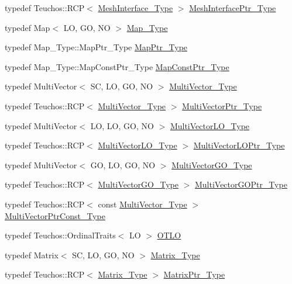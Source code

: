\begin{DoxyCompactItemize}
\item 
typedef Teuchos\+::\+R\+CP$<$ \hyperlink{classFEDD_1_1ErrorEstimation_a11fff10f0a859ff6a2bef01b0ac73943}{Mesh\+Interface\+\_\+\+Type} $>$ \hyperlink{classFEDD_1_1ErrorEstimation_aa6871369b5b28e20aac7c7178cdde50e}{Mesh\+Interface\+Ptr\+\_\+\+Type}
\item 
typedef Map$<$ LO, GO, NO $>$ \hyperlink{classFEDD_1_1ErrorEstimation_a94d0ce98d9e797cc35769bda8d3ef9fc}{Map\+\_\+\+Type}
\item 
typedef Map\+\_\+\+Type\+::\+Map\+Ptr\+\_\+\+Type \hyperlink{classFEDD_1_1ErrorEstimation_aaa2f9c22726907f5403cdeb0261b67fd}{Map\+Ptr\+\_\+\+Type}
\item 
typedef Map\+\_\+\+Type\+::\+Map\+Const\+Ptr\+\_\+\+Type \hyperlink{classFEDD_1_1ErrorEstimation_ad45c898ab6123b9e7d5efbc0e5365ccf}{Map\+Const\+Ptr\+\_\+\+Type}
\item 
typedef Multi\+Vector$<$ SC, LO, GO, NO $>$ \hyperlink{classFEDD_1_1ErrorEstimation_a1c6fa9610a1e5e887e5a88ab33f1c792}{Multi\+Vector\+\_\+\+Type}
\item 
typedef Teuchos\+::\+R\+CP$<$ \hyperlink{classFEDD_1_1ErrorEstimation_a1c6fa9610a1e5e887e5a88ab33f1c792}{Multi\+Vector\+\_\+\+Type} $>$ \hyperlink{classFEDD_1_1ErrorEstimation_a5882ff373bf8c409b407b4fd1f42bda0}{Multi\+Vector\+Ptr\+\_\+\+Type}
\item 
typedef Multi\+Vector$<$ LO, LO, GO, NO $>$ \hyperlink{classFEDD_1_1ErrorEstimation_aabbb5539b0703f8c6c04fb6595397631}{Multi\+Vector\+L\+O\+\_\+\+Type}
\item 
typedef Teuchos\+::\+R\+CP$<$ \hyperlink{classFEDD_1_1ErrorEstimation_aabbb5539b0703f8c6c04fb6595397631}{Multi\+Vector\+L\+O\+\_\+\+Type} $>$ \hyperlink{classFEDD_1_1ErrorEstimation_a00ba9c6b6b8c876b403e9c3a3c036151}{Multi\+Vector\+L\+O\+Ptr\+\_\+\+Type}
\item 
typedef Multi\+Vector$<$ GO, LO, GO, NO $>$ \hyperlink{classFEDD_1_1ErrorEstimation_a450a5b3954044f55167783097b934bbd}{Multi\+Vector\+G\+O\+\_\+\+Type}
\item 
typedef Teuchos\+::\+R\+CP$<$ \hyperlink{classFEDD_1_1ErrorEstimation_a450a5b3954044f55167783097b934bbd}{Multi\+Vector\+G\+O\+\_\+\+Type} $>$ \hyperlink{classFEDD_1_1ErrorEstimation_ae8bf11f0cc5d77bca487f6e2541a57b8}{Multi\+Vector\+G\+O\+Ptr\+\_\+\+Type}
\item 
typedef Teuchos\+::\+R\+CP$<$ const \hyperlink{classFEDD_1_1ErrorEstimation_a1c6fa9610a1e5e887e5a88ab33f1c792}{Multi\+Vector\+\_\+\+Type} $>$ \hyperlink{classFEDD_1_1ErrorEstimation_af61aa23cb14996e497a1176d8fea650d}{Multi\+Vector\+Ptr\+Const\+\_\+\+Type}
\item 
typedef Teuchos\+::\+Ordinal\+Traits$<$ LO $>$ \hyperlink{classFEDD_1_1ErrorEstimation_a1b356a52ad66b086de32457a51104038}{O\+T\+LO}
\item 
typedef Matrix$<$ SC, LO, GO, NO $>$ \hyperlink{classFEDD_1_1ErrorEstimation_a4c4fef6ebb4e98048a10b84069371e80}{Matrix\+\_\+\+Type}
\item 
typedef Teuchos\+::\+R\+CP$<$ \hyperlink{classFEDD_1_1ErrorEstimation_a4c4fef6ebb4e98048a10b84069371e80}{Matrix\+\_\+\+Type} $>$ \hyperlink{classFEDD_1_1ErrorEstimation_a087074cb92827fb21dac83cb1644c244}{Matrix\+Ptr\+\_\+\+Type}
\end{DoxyCompactItemize}
